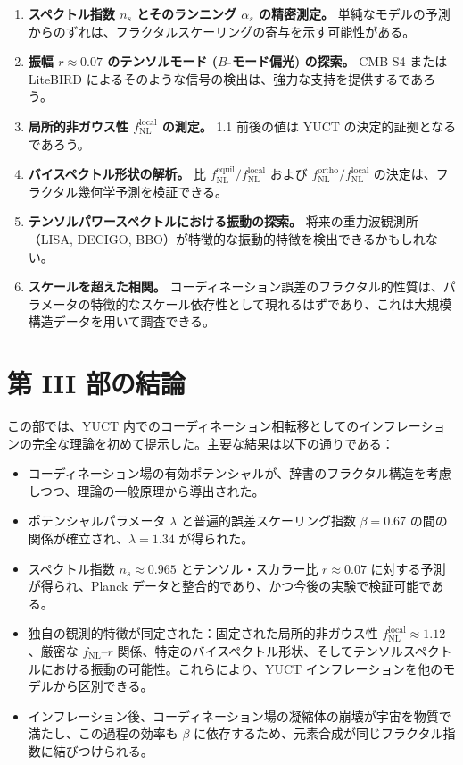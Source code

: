 \documentclass[11pt,a4paper]{article}
\begin{document}
	\begin{enumerate}
		\item \textbf{スペクトル指数 \(n_s\) とそのランニング \(\alpha_s\) の精密測定。} 単純なモデルの予測からのずれは、フラクタルスケーリングの寄与を示す可能性がある。
		\item \textbf{振幅 \(r \approx 0.07\) のテンソルモード (\(B\)-モード偏光) の探索。} CMB‑S4 または LiteBIRD によるそのような信号の検出は、強力な支持を提供するであろう。
		\item \textbf{局所的非ガウス性 \(f_{\text{NL}}^{\text{local}}\) の測定。} 1.1 前後の値は YUCT の決定的証拠となるであろう。
		\item \textbf{バイスペクトル形状の解析。} 比 \(f_{\text{NL}}^{\text{equil}}/f_{\text{NL}}^{\text{local}}\) および \(f_{\text{NL}}^{\text{ortho}}/f_{\text{NL}}^{\text{local}}\) の決定は、フラクタル幾何学予測を検証できる。
		\item \textbf{テンソルパワースペクトルにおける振動の探索。} 将来の重力波観測所（LISA, DECIGO, BBO）が特徴的な振動的特徴を検出できるかもしれない。
		\item \textbf{スケールを超えた相関。} コーディネーション誤差のフラクタル的性質は、パラメータの特徴的なスケール依存性として現れるはずであり、これは大規模構造データを用いて調査できる。
	\end{enumerate}
	
	\section{第 III 部の結論}
	\label{sec:conclusion-inflation}
	
	この部では、YUCT 内でのコーディネーション相転移としてのインフレーションの完全な理論を初めて提示した。主要な結果は以下の通りである：
	
	\begin{itemize}
		\item コーディネーション場の有効ポテンシャルが、辞書のフラクタル構造を考慮しつつ、理論の一般原理から導出された。
		\item ポテンシャルパラメータ \(\lambda\) と普遍的誤差スケーリング指数 \(\beta = 0.67\) の間の関係が確立され、\(\lambda = 1.34\) が得られた。
		\item スペクトル指数 \(n_s \approx 0.965\) とテンソル・スカラー比 \(r \approx 0.07\) に対する予測が得られ、Planck データと整合的であり、かつ今後の実験で検証可能である。
		\item 独自の観測的特徴が同定された：固定された局所的非ガウス性 \(f_{\text{NL}}^{\text{local}} \approx 1.12\)、厳密な \(f_{\text{NL}}\)–\(r\) 関係、特定のバイスペクトル形状、そしてテンソルスペクトルにおける振動の可能性。これらにより、YUCT インフレーションを他のモデルから区別できる。
		\item インフレーション後、コーディネーション場の凝縮体の崩壊が宇宙を物質で満たし、この過程の効率も \(\beta\) に依存するため、元素合成が同じフラクタル指数に結びつけられる。
	\end{itemize}
	
\end{document}
